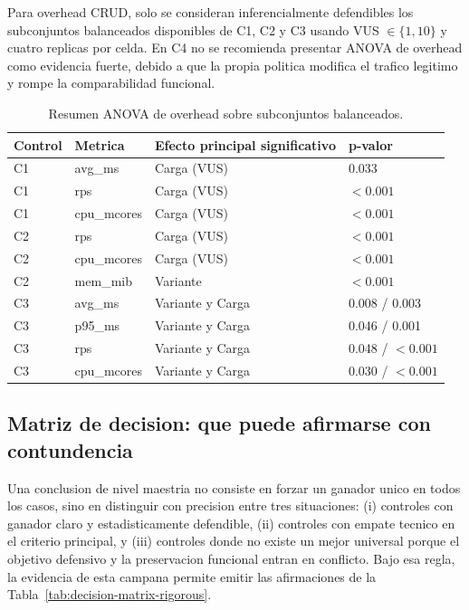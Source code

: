 Para overhead CRUD, solo se consideran inferencialmente defendibles los subconjuntos balanceados disponibles de C1, C2 y C3 usando VUS $\in \{1,10\}$ y cuatro replicas por celda. En C4 no se recomienda presentar ANOVA de overhead como evidencia fuerte, debido a que la propia politica modifica el trafico legitimo y rompe la comparabilidad funcional.

\begin{table}[htbp]
\centering
\small
\caption{Resumen ANOVA de overhead sobre subconjuntos balanceados.}
\label{tab:overhead-anova-summary}
\begin{tabular}{llll}
\toprule
Control & Metrica & Efecto principal significativo & p-valor \\
\midrule
C1 & avg\_ms & Carga (VUS) & 0.033 \\
C1 & rps & Carga (VUS) & $< 0.001$ \\
C1 & cpu\_mcores & Carga (VUS) & $< 0.001$ \\
C2 & rps & Carga (VUS) & $< 0.001$ \\
C2 & cpu\_mcores & Carga (VUS) & $< 0.001$ \\
C2 & mem\_mib & Variante & $< 0.001$ \\
C3 & avg\_ms & Variante y Carga & 0.008 / 0.003 \\
C3 & p95\_ms & Variante y Carga & 0.046 / 0.001 \\
C3 & rps & Variante y Carga & 0.048 / $< 0.001$ \\
C3 & cpu\_mcores & Variante y Carga & 0.030 / $< 0.001$ \\
\bottomrule
\end{tabular}
\end{table}

\subsection{Matriz de decision: que puede afirmarse con contundencia}

Una conclusion de nivel maestria no consiste en forzar un ganador unico en todos los casos, sino en distinguir con precision entre tres situaciones: (i) controles con ganador claro y estadisticamente defendible, (ii) controles con empate tecnico en el criterio principal, y (iii) controles donde no existe un mejor universal porque el objetivo defensivo y la preservacion funcional entran en conflicto. Bajo esa regla, la evidencia de esta campana permite emitir las afirmaciones de la Tabla~\ref{tab:decision-matrix-rigorous}.

